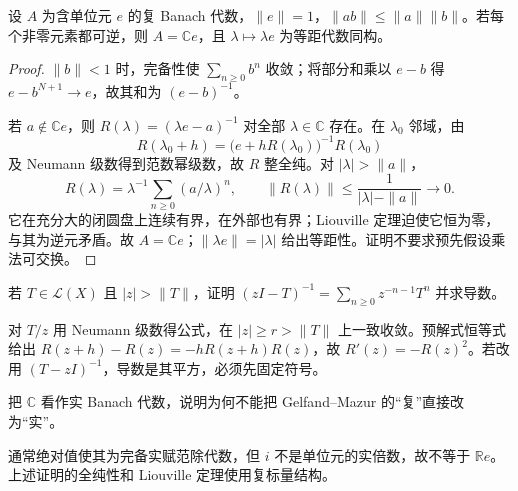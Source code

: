 \begin{theorem}\label{thm:y5-gelfand-mazur}
设 $A$ 为含单位元 $e$ 的复 Banach 代数，$\|e\|=1$，$\|ab\|\le\|a\|\|b\|$。若每个非零元素都可逆，则 $A=\mathbb C e$，且 $\lambda\mapsto\lambda e$ 为等距代数同构。
\end{theorem}
\begin{proof}
$\|b\|<1$ 时，完备性使 $\sum_{n\ge0}b^n$ 收敛；将部分和乘以 $e-b$ 得 $e-b^{N+1}\to e$，故其和为 $(e-b)^{-1}$。

若 $a\notin\mathbb C e$，则 $R(\lambda)=(\lambda e-a)^{-1}$ 对全部 $\lambda\in\mathbb C$ 存在。在 $\lambda_0$ 邻域，由
\[
 R(\lambda_0+h)=\bigl(e+hR(\lambda_0)\bigr)^{-1}R(\lambda_0)
\]
及 Neumann 级数得到范数幂级数，故 $R$ 整全纯。对 $|\lambda|>\|a\|$，
\[
 R(\lambda)=\lambda^{-1}\sum_{n\ge0}(a/\lambda)^n,\qquad
 \|R(\lambda)\|\le\frac1{|\lambda|-\|a\|}\longrightarrow0.
\]
它在充分大的闭圆盘上连续有界，在外部也有界；Liouville 定理迫使它恒为零，与其为逆元矛盾。故 $A=\mathbb C e$；$\|\lambda e\|=|\lambda|$ 给出等距性。证明不要求预先假设乘法可交换。
\end{proof}

\begin{exercise}[预解式导数的符号]\label{ex:y5-resolvent}
若 $T\in\mathcal L(X)$ 且 $|z|>\|T\|$，证明 $(zI-T)^{-1}=\sum_{n\ge0}z^{-n-1}T^n$ 并求导数。
\end{exercise}
\begin{solution}
对 $T/z$ 用 Neumann 级数得公式，在 $|z|\ge r>\|T\|$ 上一致收敛。预解式恒等式给出 $R(z+h)-R(z)=-hR(z+h)R(z)$，故 $R'(z)=-R(z)^2$。若改用 $(T-zI)^{-1}$，导数是其平方，必须先固定符号。
\end{solution}

\begin{exercise}[实数域的区别]\label{ex:y5-real-field}
把 $\mathbb C$ 看作实 Banach 代数，说明为何不能把 Gelfand--Mazur 的“复”直接改为“实”。
\end{exercise}
\begin{solution}
通常绝对值使其为完备实赋范除代数，但 $i$ 不是单位元的实倍数，故不等于 $\mathbb R e$。上述证明的全纯性和 Liouville 定理使用复标量结构。
\end{solution}
